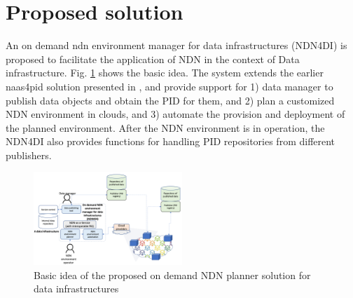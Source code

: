 \documentclass[conference]{IEEEtran}
\begin{document}
\section{Proposed solution}
An on demand \gls{ndn} environment manager for data infrastructures (NDN4DI) is proposed to facilitate the application of NDN in the context of Data infrastructure. Fig. \ref{fig:architecture-new} shows the basic idea. The system extends the earlier \gls{naas4pid} solution presented in \cite{koulouzis2018information}, and provide support for 1) data manager to publish data objects and obtain the PID for them, and 2) plan a customized NDN environment in clouds, and 3) automate the provision and deployment of the planned environment. After the NDN environment is in operation, the NDN4DI also provides functions for handling PID repositories from different publishers.  

\begin{figure}[ht]
\centering
\label{fig:architecture-new}
\includegraphics[width=0.5\textwidth]{images/NDN-pub-planner.png}
\caption{Basic idea of the proposed on demand NDN planner solution for data infrastructures}
\end{figure}



\end{document}
